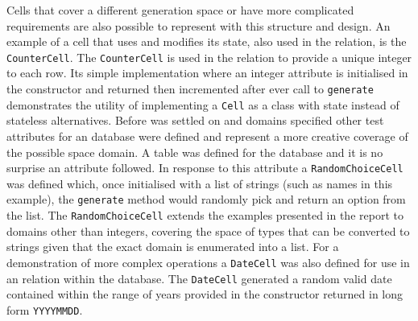 Cells that cover a different generation space or have more complicated
requirements are also possible to represent with this structure and design. An
example of a cell that uses and modifies its state, also used in the
 relation, is the \lstinline{CounterCell}. The
\lstinline{CounterCell} is used in the  relation to provide
a unique integer to each row. Its simple implementation where an integer
attribute is initialised in the constructor and returned then incremented after
ever call to \lstinline{generate} demonstrates the utility of implementing a
\lstinline{Cell} as a class with state instead of stateless alternatives. Before
 was settled on and domains specified other test attributes
for an  database were defined and represent a more creative
coverage of the possible space domain. A  table was defined
for the  database and it is no surprise an
 attribute followed. In response to this attribute
a \lstinline{RandomChoiceCell} was defined which, once initialised with a list
of strings (such as names in this example), the \lstinline{generate} method
would randomly pick and return an option from the list. The
\lstinline{RandomChoiceCell} extends the examples presented in the report to
domains other than integers, covering the space of types that can be converted
to strings given that the exact domain is enumerated into a list. For a
demonstration of more complex operations a \lstinline{DateCell} was also defined
for use in an  relation within the 
database. The \lstinline{DateCell} generated a random valid date contained within the range of
years provided in the constructor returned in long form \verb|YYYYMMDD|.


